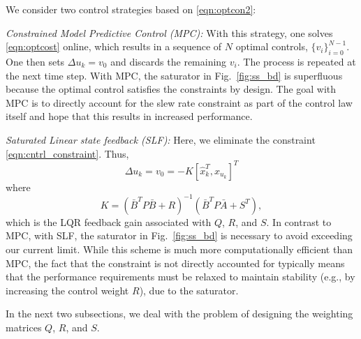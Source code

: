 \documentclass[twocolumn,twoside]{IEEEtran}
\newcommand{\Ad}{\ensuremath{\bar A }\xspace}
\newcommand{\Bd}{\ensuremath{\bar B }\xspace}
\begin{document}
We consider two control strategies based on \eqref{eqn:optcon2}:
\par\noindent\emph{Constrained Model Predictive Control (MPC):} With this strategy, one solves \eqref{eqn:optcost} online, which results in a sequence of $N$ optimal controls, $\{v_i\}_{i=0}^{N-1}$.
One then sets $\Delta u_k = v_0$ and discards the remaining $v_i$. The process is repeated at the next time step. With MPC, the saturator in Fig.~\ref{fig:ss_bd} is superfluous because the optimal control satisfies the constraints by design. The goal with MPC is to directly account for the slew rate constraint as part of the control law itself and hope that this results in increased performance.
\par\noindent\emph{Saturated Linear state feedback (SLF):}
  Here, we eliminate the constraint \eqref{eqn:cntrl_constraint}. Thus,
  \begin{equation*}
    \Delta u_k =v_0 = -K[\hat{x}^T_k, x_{u_k}]^T
  \end{equation*}
  where 
\begin{equation*}
  K = (\Bd^TP\Bd + R)^{-1}(\Bd^TP\Ad + S^T),
\end{equation*}
which is the LQR feedback gain associated with $Q$, $R$, and $S$. 
In contrast to MPC, with SLF, the saturator in Fig.~\ref{fig:ss_bd} is necessary to avoid exceeding our current limit. While this scheme is much more computationally efficient than MPC, the fact that the constraint is not directly accounted for typically means that the performance requirements must be relaxed to maintain stability (e.g., by increasing the control weight $R$), due to the saturator.

In the next two subsections, we deal with the problem of designing the weighting matrices $Q$, $R$, and $S$.
\end{document}
